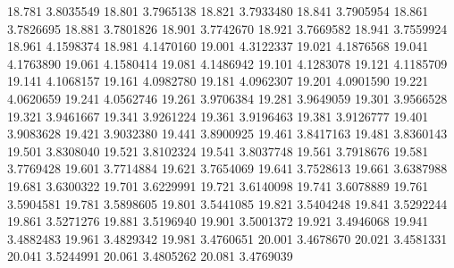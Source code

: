 18.781 3.8035549
18.801 3.7965138
18.821 3.7933480
18.841 3.7905954
18.861 3.7826695
18.881 3.7801826
18.901 3.7742670
18.921 3.7669582
18.941 3.7559924
18.961 4.1598374
18.981 4.1470160
19.001 4.3122337
19.021 4.1876568
19.041 4.1763890
19.061 4.1580414
19.081 4.1486942
19.101 4.1283078
19.121 4.1185709
19.141 4.1068157
19.161 4.0982780
19.181 4.0962307
19.201 4.0901590
19.221 4.0620659
19.241 4.0562746
19.261 3.9706384
19.281 3.9649059
19.301 3.9566528
19.321 3.9461667
19.341 3.9261224
19.361 3.9196463
19.381 3.9126777
19.401 3.9083628
19.421 3.9032380
19.441 3.8900925
19.461 3.8417163
19.481 3.8360143
19.501 3.8308040
19.521 3.8102324
19.541 3.8037748
19.561 3.7918676
19.581 3.7769428
19.601 3.7714884
19.621 3.7654069
19.641 3.7528613
19.661 3.6387988
19.681 3.6300322
19.701 3.6229991
19.721 3.6140098
19.741 3.6078889
19.761 3.5904581
19.781 3.5898605
19.801 3.5441085
19.821 3.5404248
19.841 3.5292244
19.861 3.5271276
19.881 3.5196940
19.901 3.5001372
19.921 3.4946068
19.941 3.4882483
19.961 3.4829342
19.981 3.4760651
20.001 3.4678670
20.021 3.4581331
20.041 3.5244991
20.061 3.4805262
20.081 3.4769039
